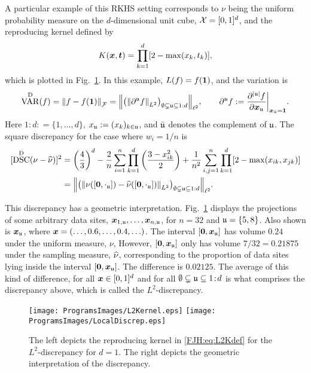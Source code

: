 \documentclass[graybox,footinfo]{svmult}
\DeclareMathOperator{\disc}{DSC}
\DeclareMathOperator{\Var}{VAR}
\begin{document}
A particular example of this RKHS setting corresponds to 
$\nu$ being the uniform probability measure on the $d$-dimensional unit cube, $\mathcal{X} 
= 
[0,1]^d$, and the reproducing kernel defined by \cite{Hic97a}
\begin{equation} \label{FJH:eq:L2Kdef}
K(\bsx,\bst) =\prod_{k = 1}^d [2 - \max(x_k,t_k)],
\end{equation}
which is plotted in Fig.\ \ref{FJH:fig:L2ker}.  In this example, $L(f) = f({\boldsymbol{1}})$, and the 
variation is 
\begin{equation*}
\Var^\Dt(f)  = \norm{f-f(\bsone)}_\cf = \Bigl \lVert \bigl ( \norm{\partial^\fraku f}_{L^2}\bigr 
)_{\emptyset \subsetneq \fraku \subseteq 1:d} \Bigr \rVert_{\ell^2} , \qquad 
\partial^\fraku f : = \frac{\partial^{\lvert\fraku\rvert} f}{\partial \bsx_\fraku} \biggr 
\rvert_{\bsx_{\bar{\fraku}} = \bsone}.
\end{equation*}
Here $1\!:\!d : = \{1, \ldots, d\}$, $x_{\mathfrak{u}} := (x_k)_{k \in {\mathfrak{u}}}$, and $\bar{{\mathfrak{u}}}$ 
denotes the complement of ${\mathfrak{u}}$.  
The square discrepancy for the case where $w_i = 1/n$ is
\begin{align}
\nonumber
[\disc^\Dt(\nu - \hnu)]^2  &= \left(\frac 43\right)^d - \frac{2}n \sum_{i=1}^n \prod_{k=1}^d 
\left (\frac{3 - x_{ik}^2}{2} \right) + \frac{1}{n^2}\sum_{i,j=1}^n \prod_{k = 1}^d [2 - 
\max(x_{ik},x_{jk})] 
\\ &= \Bigl \lVert \bigl ( \norm{\nu([\bszero,\cdot_\fraku]) - 
	\hnu([\bszero,\cdot_\fraku])}_{L^2}\bigr )_{\emptyset \subsetneq \fraku \subseteq 1:d} 
	\Bigr 
	\rVert_{\ell^2}. \label{FJH:eq:L2disc}
\end{align}

This discrepancy has a geometric interpretation. Fig.\ \ref{FJH:fig:L2ker} displays the 
projections of some arbitrary 
data sites, ${\boldsymbol{x}}_{1,{\mathfrak{u}}}, \ldots, {\boldsymbol{x}}_{n,{\mathfrak{u}}}$, for $n=32$ and ${\mathfrak{u}} = \{5,8\}$.  
Also 
shown is ${\boldsymbol{x}}_{\mathfrak{u}}$, where ${\boldsymbol{x}} = (\ldots, 0.6, \ldots, 0.4, \ldots)$. The interval 
$[{\boldsymbol{0}},{\boldsymbol{x}}_{\mathfrak{u}}]$ has volume $0.24$ under the uniform measure, $\nu$, However, 
$[{\boldsymbol{0}},{\boldsymbol{x}}_{\mathfrak{u}}]$ only has 
volume $7/32 = 0.21875$ under the sampling measure, $\widehat{\nu}$, corresponding to the 
proportion of data sites lying inside the interval $[{\boldsymbol{0}},{\boldsymbol{x}}_{\mathfrak{u}}]$. The difference is 
$0.02125$.  The average of this kind of difference, for all ${\boldsymbol{x}} \in [0,1]^d$ and for all 
$\emptyset \subsetneq {\mathfrak{u}} 
\subseteq 1\!:\!d$ is what comprises the discrepancy above, which is called the 
$L^2$-discrepancy.

\begin{figure}
	\centering
	\texttt{[image: ProgramsImages/L2Kernel.eps]}\qquad
	\texttt{[image: ProgramsImages/LocalDiscrep.eps]}
	\caption{The left depicts the reproducing kernel in \eqref{FJH:eq:L2Kdef} for the 
	$L^2$-discrepancy 
	for $d=1$.  The right depicts the geometric interpretation of the discrepancy.
	\label{FJH:fig:L2ker}}
\end{figure}
\end{document}
